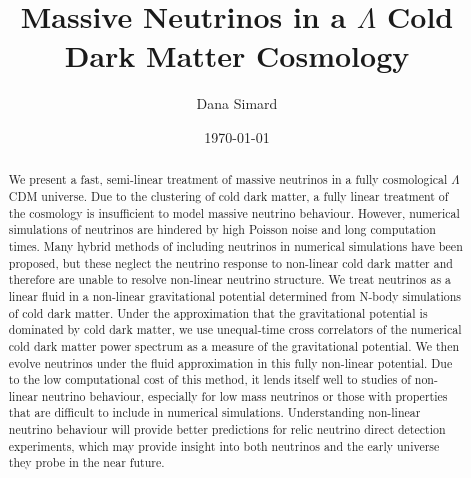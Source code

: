 \documentclass[twocolumn,superscriptaddress,prd]{revtex4}
\begin{document}
\title{Massive Neutrinos in a $\Lambda$ Cold Dark Matter Cosmology}
\date{\today}

\author{ Dana Simard }



\begin{abstract}
We present a fast, semi-linear treatment of massive
neutrinos in a fully cosmological $\Lambda$CDM universe.
Due to the clustering of cold dark matter, a fully linear
treatment of the cosmology is insufficient to model massive neutrino
behaviour.  
However, numerical simulations of neutrinos are hindered
by high Poisson noise and long computation times.
Many hybrid methods of including neutrinos in numerical
simulations have been proposed, but these neglect the neutrino
response to non-linear cold dark matter %
and therefore are unable to
resolve non-linear neutrino structure. 
We treat neutrinos as a linear fluid in a non-linear gravitational
potential determined from N-body simulations of cold dark matter.
Under the approximation that the gravitational potential is dominated
by cold dark matter, we use unequal-time cross correlators of the
numerical cold dark matter power
spectrum as a measure of the gravitational potential. 
We then evolve neutrinos under the fluid approximation 
in this fully non-linear potential.
Due to the low computational cost of this method, it lends itself well
to studies of non-linear neutrino behaviour, especially for low mass
neutrinos or those with properties that are difficult to
include in numerical simulations.  Understanding non-linear neutrino
behaviour will provide better predictions for relic neutrino
direct detection experiments, 
which may provide insight into both 
neutrinos and the early universe they probe in the near future.
\end{abstract}
\end{document}

